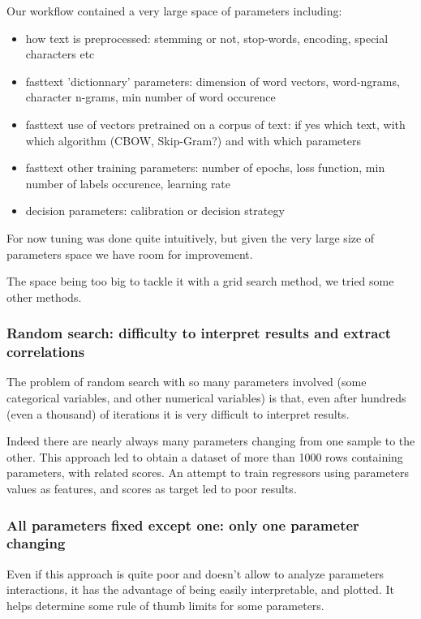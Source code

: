Our workflow contained a very large space of parameters including:
\begin{itemize}
	\item how text is preprocessed: stemming or not, stop-words, encoding, special characters etc
	\item fasttext 'dictionnary' parameters: dimension of word vectors, word-ngrams, character n-grams, min number of word occurence
	\item fasttext use of vectors pretrained on a corpus of text: if yes which text, with which algorithm (CBOW, Skip-Gram?) and with which parameters
	\item fasttext other training parameters: number of epochs, loss function, min number of labels occurence, learning rate
	\item decision parameters: calibration or decision strategy
\end{itemize}

For now tuning was done quite intuitively, but given the very large size of parameters space we have room for improvement.

The space being too big to tackle it with a grid search method, we tried some other methods.

\subsubsection{Random search: difficulty to interpret results and extract correlations}

The problem of random search with so many parameters involved (some categorical variables, and other numerical variables) is that, even after hundreds (even a thousand) of iterations it is very difficult to interpret results.

Indeed there are nearly always many parameters changing from one sample to the other. This approach led to obtain a dataset of more than 1000 rows containing parameters, with related scores. An attempt to train regressors using parameters values as features, and scores as target led to poor results. 

\subsubsection{All parameters fixed except one: only one parameter changing}
Even if this approach is quite poor and doesn't allow to analyze parameters interactions, it has the advantage of being easily interpretable, and plotted.
It helps determine some rule of thumb limits for some parameters.


